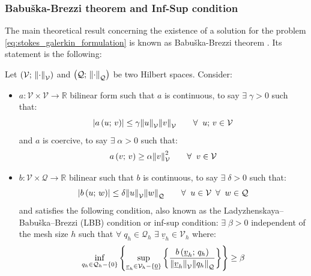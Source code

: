 \documentclass[11pt,a4paper]{article}
\newcommand{\R}{\mathds{R}}
\renewcommand{\abs}[1]{\left| #1 \right| } %
\renewcommand{\vec}[1]{\underline{#1}} %
\let\oldforall\forall
\renewcommand{\forall}{\oldforall \; }
\let\oldexists\exists
\renewcommand{\exists}{\oldexists \; }
\begin{document}
\subsubsection{Babuška-Brezzi theorem and Inf-Sup condition}
The main theoretical result concerning the existence of a solution for the problem \eqref{eq:stokes_galerkin_formulation} is known as Babuška-Brezzi theorem \cite{BrezziFortin1991}. Its statement is the following: 
\begin{theorem}
    \label{theo:babuska_brezzi_theorem}
    Let $\left( \mathcal{V}; \, \norm{\cdot}_{\mathcal{V}}\right)$ and $\left( \mathcal{Q}; \, \norm{\cdot}_{\mathcal{Q}}\right)$ be two Hilbert spaces. Consider: 
    \begin{itemize}
        \item $a : \mathcal{V} \times \mathcal{V} \to \R$ bilinear form such that $a$ is continuous, to say $\exists \gamma > 0$ such that: 
        \begin{equation*}
            \abs{a\left(u; \, v \right)} \leq \gamma \norm{u}_{\mathcal{V}} \norm{v}_{\mathcal{V}} \qquad \forall u; \, v \in \mathcal{V}
        \end{equation*}
        and $a$ is coercive, to say $\exists \alpha > 0$ such that: 
        \begin{equation*}
            a\left(v; \, v \right) \geq \alpha \norm{v}^{2}_{\mathcal{V}} \qquad \forall v \in \mathcal{V}
        \end{equation*}
        \item $b : \mathcal{V} \times \mathcal{Q \to \R}$ bilinear such that $b$ is continuous, to say $\exists \delta > 0$ such that: 
        \begin{equation*}
            \abs{b\left(u; \, w \right)} \leq \delta \norm{u}_{\mathcal{V}} \norm{w}_{\mathcal{Q}} \qquad \forall u \in \mathcal{V} \enspace \forall w \in \mathcal{Q}
        \end{equation*}
        and satisfies the following condition, also known as the Ladyzhenskaya–Babuška–Brezzi (LBB) condition or inf-sup condition: $\exists \beta > 0$ independent of the mesh size $h$ such that $\forall q_{h} \in \mathcal{Q}_{h}$ $\exists \vec{v}_{h} \in \mathcal{V}_{h}$ where:
        \begin{equation}
            \label{eq:lbb_condition}
            \inf_{q_{h} \in \mathcal{Q}_{h} - \{0\}} \left\{ \sup_{\vec{v}_{h} \in \mathcal{V}_{h} - \{\vec{0}\}} \left\{ \frac{b \left(\vec{v}_{h}; \, q_{h} \right)}{\norm{\vec{v}_{h}}_{\mathcal{V}} \norm{q_{h}}_{\mathcal{Q}}}\right\} \right\} \geq \beta

\end{equation}
\end{itemize}
\end{theorem}
\end{document}
